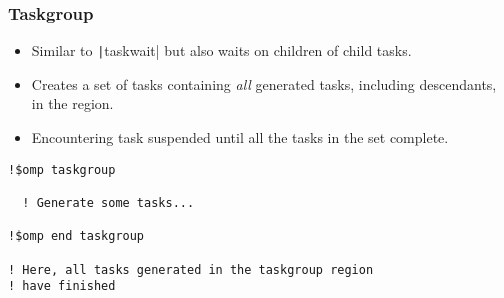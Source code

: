 \documentclass{beamer}
\begin{document}
\begin{frame}[fragile]
\frametitle{Taskgroup}

\begin{itemize}
  \item Similar to \texttt|taskwait| but also waits on children of child tasks.
  \item Creates a set of tasks containing \emph{all} generated tasks, including descendants, in the region.
  \item Encountering task suspended until all the tasks in the set complete.
\end{itemize}

\begin{verbatim}
!$omp taskgroup

  ! Generate some tasks...

!$omp end taskgroup

! Here, all tasks generated in the taskgroup region
! have finished

\end{verbatim}

\end{frame}
\end{document}
